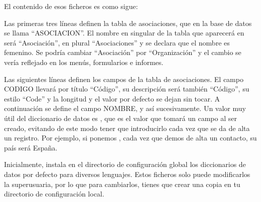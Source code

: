 El contenido de esos ficheros es como sigue:



\begin{center}
\begin{minipage}{16.249cm}




\bigskip






\end{minipage}
\end{center}

\bigskip


\bigskip


\bigskip

Las primeras tres líneas definen la tabla de asociaciones, que en la
base de datos se llama
{\textquotedblleft}ASOCIACION{\textquotedblright}. El nombre en
singular de la tabla que aparecerá en \appname será
{\textquotedblleft}Asociación{\textquotedblright}, en plural
{\textquotedblleft}Asociaciones{\textquotedblright} y se declara que el
nombre es femenino. Se podría cambiar
{\textquotedblleft}Asociación{\textquotedblright} por
{\textquotedblleft}Organización{\textquotedblright} y el cambio se
vería reflejado en los menús, formularios e informes.

Las siguientes líneas definen los campos de la tabla de asociaciones.
El campo CODIGO llevará por título
{\textquotedblleft}Código{\textquotedblright}, su descripción
será también {\textquotedblleft}Código{\textquotedblright}, su
estilo {\textquotedblleft}Code{\textquotedblright} y la longitud y el
valor por defecto se dejan sin tocar. A continuación se define el
campo NOMBRE, y así sucesivamente. Un valor muy útil del
diccionario de datos es , que es el
valor que tomará un campo al ser creado, evitando de este modo tener
que introducirlo cada vez que se da de alta un registro. Por ejemplo,
si ponemos ,
cada vez que demos de alta un contacto, su país será España.

Inicialmente, \appname instala en el directorio de configuración
global los diccionarios de datos por defecto para diversos lenguajes.
Estos ficheros solo puede modificarlos la superusuaria, por lo que para
cambiarlos, tienes que crear una copia en tu directorio de
configuración local.
